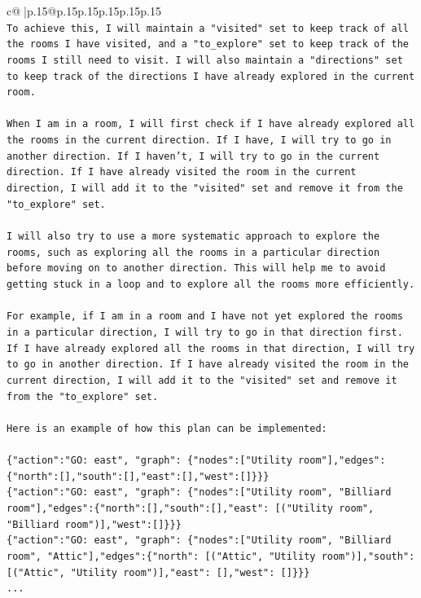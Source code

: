\documentclass{article}
\begin{document}
{\begin{supertabular}{c@{$\;$}|p{.15\linewidth}@{}p{.15\linewidth}p{.15\linewidth}p{.15\linewidth}p{.15\linewidth}p{.15\linewidth}}
{{{\\ 
\texttt{To achieve this, I will maintain a "visited" set to keep track of all the rooms I have visited, and a "to\_explore" set to keep track of the rooms I still need to visit. I will also maintain a "directions" set to keep track of the directions I have already explored in the current room.} \\
\\ 
\texttt{When I am in a room, I will first check if I have already explored all the rooms in the current direction. If I have, I will try to go in another direction. If I haven't, I will try to go in the current direction. If I have already visited the room in the current direction, I will add it to the "visited" set and remove it from the "to\_explore" set.} \\
\\ 
\texttt{I will also try to use a more systematic approach to explore the rooms, such as exploring all the rooms in a particular direction before moving on to another direction. This will help me to avoid getting stuck in a loop and to explore all the rooms more efficiently.} \\
\\ 
\texttt{For example, if I am in a room and I have not yet explored the rooms in a particular direction, I will try to go in that direction first. If I have already explored all the rooms in that direction, I will try to go in another direction. If I have already visited the room in the current direction, I will add it to the "visited" set and remove it from the "to\_explore" set.} \\
\\ 
\texttt{Here is an example of how this plan can be implemented:} \\
\\ 
\texttt{\{"action":"GO: east", "graph": \{"nodes":{[}"Utility room"{]},"edges":\{"north":{[}{]},"south":{[}{]},"east":{[}{]},"west":{[}{]}\}\}\}} \\
\texttt{\{"action":"GO: east", "graph": \{"nodes":{[}"Utility room", "Billiard room"{]},"edges":\{"north":{[}{]},"south":{[}{]},"east": {[}("Utility room", "Billiard room"){]},"west":{[}{]}\}\}\}} \\
\texttt{\{"action":"GO: east", "graph": \{"nodes":{[}"Utility room", "Billiard room", "Attic"{]},"edges":\{"north": {[}("Attic", "Utility room"){]},"south": {[}("Attic", "Utility room"){]},"east": {[}{]},"west": {[}{]}\}\}\}} \\
\texttt{...} \\
}}}
\end{supertabular}}
\end{document}
